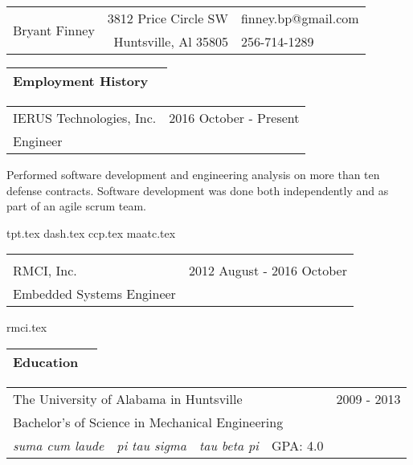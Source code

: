 \documentclass[10pt,a4paper]{article}
\begin{document}
\begin{table}
  \noindent\begin{tabularx}{\textwidth}{Xr|l}
    \toprule
    \multirow{2}{*}{\Huge Bryant Finney} & 3812 Price Circle SW & finney.bp@gmail.com \\
                                                  & Huntsville, Al 35805 & 256-714-1289 \\
    \bottomrule
  \end{tabularx}
\end{table}

\noindent\begin{tabularx}{\textwidth}{Xr}
  \Large Employment History & \\
  \bottomrule
\end{tabularx}
\smallskip

\noindent\begin{tabularx}{\textwidth}{Xr}
  IERUS Technologies, Inc. & 2016 October - Present \\
  Engineer & \\
\end{tabularx}
\smallskip

Performed software development and engineering analysis on more than ten defense
contracts. Software development was done both independently and as part of an agile
scrum team.

\bigskip

{tpt.tex}
{dash.tex}
{ccp.tex}
{maatc.tex}

\noindent\begin{tabularx}{\textwidth}{Xr}
  \Large \\ \bottomrule \\
  RMCI, Inc. & 2012 August - 2016 October \\
  Embedded Systems Engineer & \\
\end{tabularx}
\smallskip

{rmci.tex}

\noindent\begin{tabularx}{\textwidth}{Xr}
  \Large Education & \\
  \bottomrule
\end{tabularx}
\smallskip

\noindent\begin{tabularx}{\textwidth}{cccXr}
  \multicolumn{3}{l}{The University of Alabama in Huntsville} & & 2009 - 2013 \\
  \multicolumn{5}{l}{\hspace{.125in} Bachelor's of Science in Mechanical Engineering} \\
  \hspace{.125in} \textit{suma cum laude} & \textit{pi tau sigma} & \textit{tau beta pi} & GPA: 4.0 \\
\end{tabularx}
\bigskip
\end{document}
